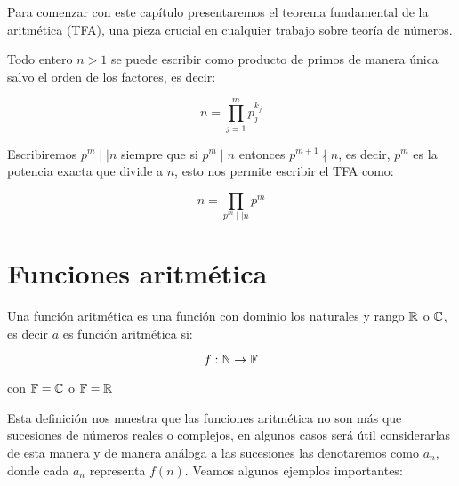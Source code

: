 
\thispagestyle{empty}
\vspace{-0.7cm}


Para comenzar con este capítulo presentaremos el teorema fundamental de la aritmética (TFA), una pieza crucial en cualquier trabajo sobre teoría de números.\\


\begin{theorem}[TFA]
Todo entero $n>1$ se puede escribir como producto de primos de manera única salvo el orden de los factores, es decir:

$$n=\prod_{j=1}^{m}p_j^{k_j}$$
\end{theorem}

Escribiremos $p^m\mid\mid n$ siempre que si $p^m\mid n$ entonces $p^{m+1}\nmid n$, es decir, $p^m$ es la potencia exacta que divide a $n$, esto nos permite escribir el TFA como:

$$n= \prod_{p^m\mid\mid n}p^m$$

\section{Funciones aritmética}

\begin{definition}
Una función aritmética es una función con dominio los naturales y rango $\mathbb{R}$ o $\mathbb{C}$, es decir $a$ es función aritmética si:

$$f:\mathbb{N} \to \mathbb{F}$$

con $\mathbb{F}=\mathbb{C}$ o $\mathbb{F}=\mathbb{R}$
\end{definition}

Esta definición nos muestra que las funciones aritmética no son más que sucesiones de números reales o complejos, en algunos casos será útil considerarlas de esta  manera y de manera análoga a  las sucesiones las denotaremos como $a_n$, donde cada $a_n$ representa $f(n)$. Veamos algunos ejemplos importantes:

